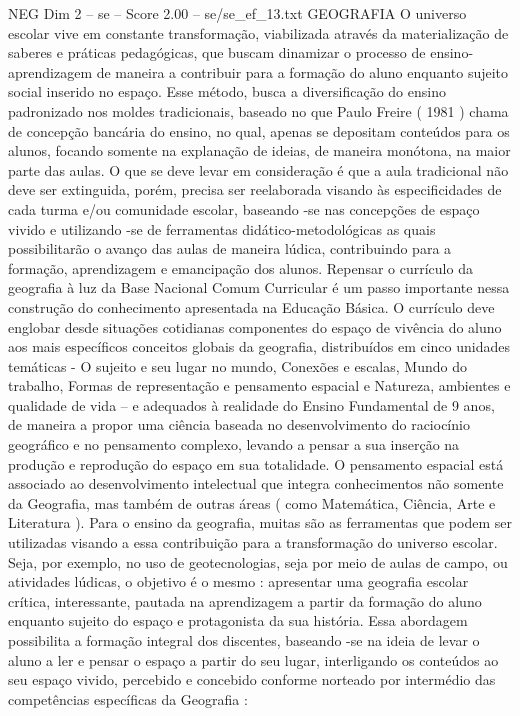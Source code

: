 \begin{textsample}{NEG Dim 2 – se – Score 2.00 – se/se\_ef\_13.txt}  \label{ex:f2_neg_269}
GEOGRAFIA O universo escolar vive em constante transformação, viabilizada através da materialização de saberes e práticas pedagógicas, que buscam dinamizar o processo de ensino-aprendizagem de maneira a contribuir para a formação do aluno enquanto sujeito social inserido no espaço.
Esse método, busca a diversificação do ensino padronizado nos moldes tradicionais, baseado no que Paulo Freire ( 1981 ) chama de concepção bancária do ensino, no qual, apenas se depositam conteúdos para os alunos, focando somente na explanação de ideias, de maneira monótona, na maior parte das aulas.
O que se deve levar em consideração é que a aula tradicional não deve ser extinguida, porém, precisa ser reelaborada visando às especificidades de cada turma e/ou comunidade escolar, baseando -se nas concepções de espaço vivido e utilizando -se de ferramentas didático-metodológicas as quais possibilitarão o avanço das aulas de maneira lúdica, contribuindo para a formação, aprendizagem e emancipação dos alunos.
Repensar o currículo da geografia à luz da Base Nacional Comum Curricular é um passo importante nessa construção do conhecimento apresentada na Educação Básica.
O currículo deve englobar desde situações cotidianas componentes do espaço de vivência do aluno aos mais específicos conceitos globais da geografia, distribuídos em cinco unidades temáticas - O sujeito e seu lugar no mundo, Conexões e escalas, Mundo do trabalho, Formas de representação e pensamento espacial e Natureza, ambientes e qualidade de vida – e adequados à realidade do Ensino Fundamental de 9 anos, de maneira a propor uma ciência baseada no desenvolvimento do raciocínio geográfico e no pensamento complexo, levando a pensar a sua inserção na produção e reprodução do espaço em sua totalidade.
O pensamento espacial está associado ao desenvolvimento intelectual que integra conhecimentos não somente da Geografia, mas também de outras áreas ( como Matemática, Ciência, Arte e Literatura ).
Para o ensino da geografia, muitas são as ferramentas que podem ser utilizadas visando a essa contribuição para a transformação do universo escolar.
Seja, por exemplo, no uso de geotecnologias, seja por meio de aulas de campo, ou atividades lúdicas, o objetivo é o mesmo : apresentar uma geografia escolar crítica, interessante, pautada na aprendizagem a partir da formação do aluno enquanto sujeito do espaço e protagonista da sua história.
Essa abordagem possibilita a formação integral dos discentes, baseando -se na ideia de levar o aluno a ler e pensar o espaço a partir do seu lugar, interligando os conteúdos ao seu espaço vivido, percebido e concebido conforme norteado por intermédio das competências específicas da Geografia :

\end{textsample}
